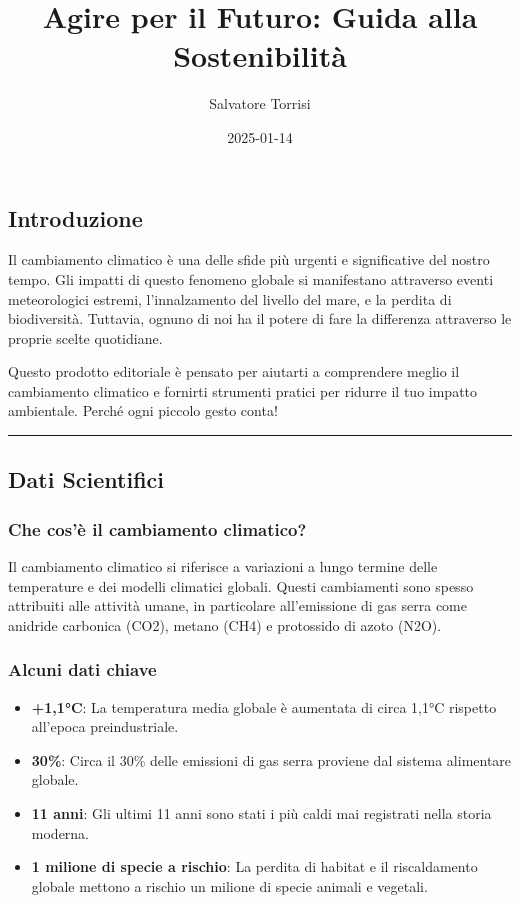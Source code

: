 \documentclass[
]{antposter}
\title{Agire per il Futuro: Guida alla Sostenibilità}
\author{Salvatore Torrisi}
\date{2025-01-14}
\providecommand{\tightlist}{%
  \setlength{\itemsep}{0pt}\setlength{\parskip}{0pt}}
\begin{document}
\maketitle

\subsection{Introduzione}\label{introduzione}

Il cambiamento climatico è una delle sfide più urgenti e significative
del nostro tempo. Gli impatti di questo fenomeno globale si manifestano
attraverso eventi meteorologici estremi, l'innalzamento del livello del
mare, e la perdita di biodiversità. Tuttavia, ognuno di noi ha il potere
di fare la differenza attraverso le proprie scelte quotidiane.

Questo prodotto editoriale è pensato per aiutarti a comprendere meglio
il cambiamento climatico e fornirti strumenti pratici per ridurre il tuo
impatto ambientale. Perché ogni piccolo gesto conta!

\begin{center}\rule{0.5\linewidth}{0.5pt}\end{center}

\subsection{Dati Scientifici}\label{dati-scientifici}

\subsubsection{Che cos'è il cambiamento
climatico?}\label{che-cosuxe8-il-cambiamento-climatico}

Il cambiamento climatico si riferisce a variazioni a lungo termine delle
temperature e dei modelli climatici globali. Questi cambiamenti sono
spesso attribuiti alle attività umane, in particolare all'emissione di
gas serra come anidride carbonica (CO2), metano (CH4) e protossido di
azoto (N2O).

\subsubsection{Alcuni dati chiave}\label{alcuni-dati-chiave}

\begin{itemize}
\tightlist
\item
  \textbf{+1,1°C}: La temperatura media globale è aumentata di circa
  1,1°C rispetto all'epoca preindustriale.
\item
  \textbf{30\%}: Circa il 30\% delle emissioni di gas serra proviene dal
  sistema alimentare globale.
\item
  \textbf{11 anni}: Gli ultimi 11 anni sono stati i più caldi mai
  registrati nella storia moderna.
\item
  \textbf{1 milione di specie a rischio}: La perdita di habitat e il
  riscaldamento globale mettono a rischio un milione di specie animali e
  vegetali.
\end{itemize}
\end{document}
